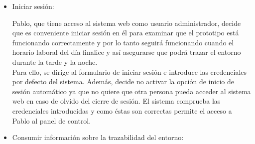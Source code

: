 \documentclass[12pt,a4paper, twoside]{report}
\begin{document}
\begin{itemize}
		Tras haber realizado la configuración inicial, Pablo prepara la localización dentro del CPD donde va a situar el sistema, decidiendo en ese momento cuáles serán los umbrales más idóneos de los eventos a partir de los cuáles los valores medidos se considerarán anómalos y activando así el protocolo de alerta. Antes de realizar la primera prueba, consulta el manual de configuración y de usuario para conocer los servicios de los que debe disponer como, por ejemplo: cuenta en el servicio de almacenamiento en la nube Dropbox, cuenta Gmail, red de negocio desplegada en la \gls{blockchain-a}, etc. \\
		
		En primer lugar, realiza la puesta en marcha y configuración de todos los servicios requeridos y obtiene las direcciones \gls{i2c-a} de los \glspl{lcd-a} las cuales introducirá como opciones en la ejecución. Posteriormente, decide ejecutar el componente de monitorización inicializando los servicios y estableciendo como umbrales límites: 80 $^{\circ}$C de temperatura y 2 metros de distancia. Con estos valores podrá controlar si se produce algún acceso no autorizado durante el horario no laboral al CPD y así intentar resolver ese contratiempo que están sufriendo cada vez más a menudo lo que les provoca una bajada de rendimiento en el ámbito laboral al no funcionar todos los sistemas, caerse la red continuamente, etc.
		
		\item Iniciar sesión:
		
		Pablo, que tiene acceso al sistema web como usuario administrador, decide que es conveniente iniciar sesión en él para examinar que el \gls{prototipo} está funcionando correctamente y por lo tanto seguirá funcionando cuando el horario laboral del día finalice y así asegurarse que podrá trazar el entorno durante la tarde y la noche. \\
		
		Para ello, se dirige al formulario de iniciar sesión e introduce las credenciales por defecto del sistema. Además, decide no activar la opción de inicio de sesión automático ya que no quiere que otra persona pueda acceder al sistema web en caso de olvido del cierre de sesión. El sistema comprueba las credenciales introducidas y como éstas son correctas permite el acceso a Pablo al panel de control.
		
		\item Consumir información sobre la trazabilidad del entorno:


\end{itemize}
\end{document}
